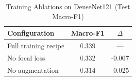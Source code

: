 \begin{table}[t]
\caption{Training Ablations on DenseNet121 (Test Macro-F1)}
\label{tab:ablation_single}
\centering
\begin{tabular}{lcc}
\toprule
Configuration & Macro-F1 & $\Delta$ \\
\midrule
Full training recipe & 0.339 & --- \\
\quad No focal loss & 0.332 & -0.007 \\
\quad No augmentation & 0.314 & -0.025 \\
\bottomrule
\end{tabular}
\end{table}
